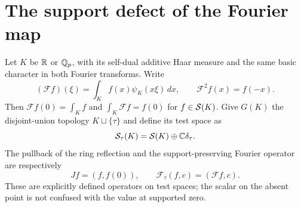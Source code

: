 \section{The support defect of the Fourier map}
\label{sec:fourier-support}
Let $K$ be $\mathbb R$ or $\mathbb Q_p$, with its self-dual additive Haar measure and the same basic character in both Fourier transforms. Write
\[
 (\mathcal F f)(\xi)=\int_K f(x)\psi_K(x\xi)\,dx,
 \qquad \mathcal F^2 f(x)=f(-x).
\]
Then $\mathcal Ff(0)=\int_Kf$ and $\int_K\mathcal Ff=f(0)$ for $f\in\mathcal S(K)$.
Give $G(K)$ the disjoint-union topology $K\sqcup\{\tau\}$ and define its test space as
\[
 \mathcal S_\tau(K)=\mathcal S(K)\oplus\mathbb C\delta_\tau.
\]
The pullback of the ring reflection and the support-preserving Fourier operator are respectively
\[
 Jf=(f,f(0)),\qquad \mathcal F_\tau(f,c)=(\mathcal Ff,c).
\]
These are explicitly defined operators on test spaces; the scalar on the absent point is not confused with the value at supported zero.

